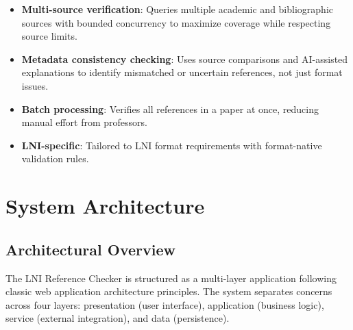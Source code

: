 \documentclass[12pt,a4paper,oneside]{report}
\begin{document}
\begin{itemize}
    \item \textbf{Multi-source verification}: Queries multiple academic and bibliographic sources with bounded concurrency to maximize coverage while respecting source limits.
    
    \item \textbf{Metadata consistency checking}: Uses source comparisons and AI-assisted explanations to identify mismatched or uncertain references, not just format issues.
    
    \item \textbf{Batch processing}: Verifies all references in a paper at once, 
    reducing manual effort from professors.
    
    \item \textbf{LNI-specific}: Tailored to LNI format requirements with 
    format-native validation rules.
\end{itemize}


\chapter{System Architecture}

\section{Architectural Overview}

The LNI Reference Checker is structured as a multi-layer application following classic web application architecture principles. The system separates concerns across four layers: presentation (user interface), application (business logic), service (external integration), and data (persistence).
\end{document}
